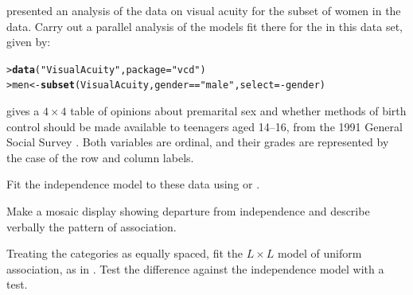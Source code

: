 \documentclass[10pt]{report}\usepackage[]{graphicx}\usepackage[]{color}
\makeatletter
\newcommand{\hlstr}[1]{\textcolor[rgb]{0.192,0.494,0.8}{#1}}%
\newcommand{\hlopt}[1]{\textcolor[rgb]{0,0,0}{#1}}%
\newcommand{\hlstd}[1]{\textcolor[rgb]{0.345,0.345,0.345}{#1}}%
\newcommand{\hlkwb}[1]{\textcolor[rgb]{0.69,0.353,0.396}{#1}}%
\newcommand{\hlkwc}[1]{\textcolor[rgb]{0.333,0.667,0.333}{#1}}%
\newcommand{\hlkwd}[1]{\textcolor[rgb]{0.737,0.353,0.396}{\textbf{#1}}}%
\newenvironment{kframe}{%
 \def\at@end@of@kframe{}%
 \ifinner\ifhmode%
  \def\at@end@of@kframe{\end{minipage}}%
  \begin{minipage}{\columnwidth}%
 \fi\fi%
 \def\FrameCommand##1{\hskip\@totalleftmargin \hskip-\fboxsep
 \colorbox{shadecolor}{##1}\hskip-\fboxsep
     \hskip-\linewidth \hskip-\@totalleftmargin \hskip\columnwidth}%
 \MakeFramed {\advance\hsize-\width
   \@totalleftmargin\z@ \linewidth\hsize
   \@setminipage}}%
 {\par\unskip\endMakeFramed%
 \at@end@of@kframe}
\newenvironment{knitrout}{}{} %
\renewenvironment{knitrout}{\small\renewcommand{\baselinestretch}{.85}}{} %
\makeatother
\begin{document}
\begin{Exercises}

  \exercise {} presented an analysis of the data on visual acuity 
  for the subset of women in the  data.  Carry out a parallel
  analysis of the models fit there for the  in this data set, given by:
\begin{knitrout}\footnotesize
{}\color{fgcolor}\begin{kframe}
\begin{alltt}
\hlstd{> }\hlkwd{data}\hlstd{(}\hlstr{"VisualAcuity"}\hlstd{,} \hlkwc{package}\hlstd{=}\hlstr{"vcd"}\hlstd{)}
\hlstd{> }\hlstd{men} \hlkwb{<-} \hlkwd{subset}\hlstd{(VisualAcuity, gender}\hlopt{==}\hlstr{"male"}\hlstd{,} \hlkwc{select}\hlstd{=}\hlopt{-}\hlstd{gender)}
\end{alltt}
\end{kframe}
\end{knitrout}
	\begin{ans}
	\end{ans}



  \exercise {} gives a $4 \times 4$ table of opinions about
  premarital sex and whether methods of birth control should be made available
  to teenagers aged 14--16, from the 1991 General Social Survey
  \citep[Table 10.3]{Agresti:2013}.  Both variables are ordinal, and their
  grades are represented by the case of the row and column labels.


  \begin{enumerate*}
    \item Fit the independence model to these data using  or .
    \begin{ans}
    \end{ans}
    
    \item Make a mosaic display showing departure from independence and describe
    verbally the pattern of association.
    \begin{ans}
    \end{ans}
    
    \item Treating the categories as equally spaced, fit the $L \times L$ model
    of uniform association, as in .  Test the
    difference against the independence model with a \LR test.
    \begin{ans}
    \end{ans}
    

\end{enumerate*}
\end{Exercises}
\end{document}
